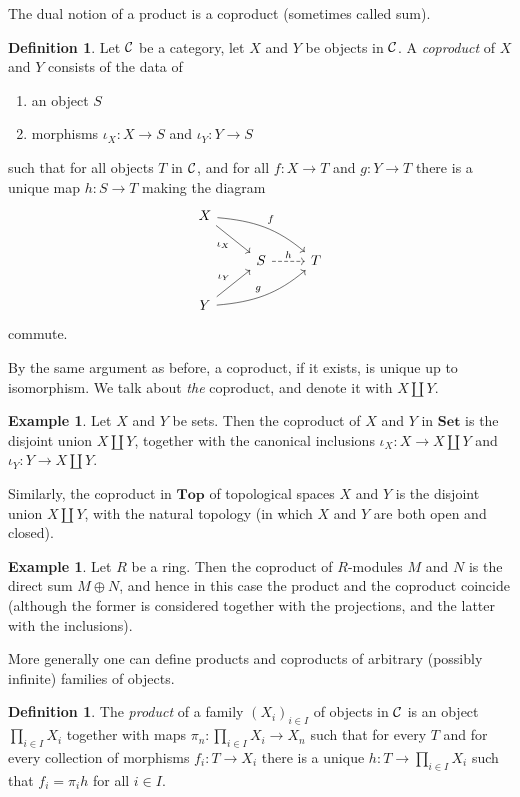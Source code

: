 \documentclass[11pt]{amsbook}
\def\Set{\mathbf{Set}}
\def\Top{\mathbf{Top}}
\theoremstyle{plain}
\theoremstyle{definition}
\newtheorem{definition}[theorem]{Definition}
\newtheorem{example}[theorem]{Example}
\begin{document}
The dual notion of a product is a coproduct  (sometimes called sum).

\begin{definition}
Let ${\mathcal{C}}$ be a category, let $X$ and $Y$ be objects in ${\mathcal{C}}$.  A \emph{coproduct} of $X$ and $Y$
consists of the data of
\begin{enumerate}
\item an object $S$
\item  morphisms $\iota_X\colon X \to S$ and $\iota_Y\colon Y \to S$
\end{enumerate}
such that for all objects $T$ in ${\mathcal{C}}$, and for all $f\colon X\to T$ and $g\colon Y\to T$ there is a unique map $h\colon S \to T$ making the diagram 
\[
\begin{tikzcd}
X \arrow[swap]{rd}{\iota_X} \arrow[out=-5,in=140]{rrd}{f} & & \\
& S \arrow[dashed]{r}{h} & T \\
Y \arrow{ru}{\iota_Y} \arrow[out=5,in=-140]{rru}{g} & & 
\end{tikzcd}
\]
commute.
\end{definition}

By the same argument as before, a coproduct, if it exists, is unique up to isomorphism. We talk about \emph{the} coproduct, and denote it with $X\amalg Y$.

\begin{example}Let $X$ and $Y$ be sets. Then the coproduct of $X$ and $Y$ in $\Set$ is the disjoint union $X\amalg Y$, together with the canonical inclusions $\iota_X \colon X\to X \amalg Y$ and $\iota_Y\colon Y \to X \amalg Y$. 

Similarly, the coproduct in $\Top$ of topological spaces $X$ and $Y$ is the disjoint union $X \amalg Y$, with the natural topology (in which $X$ and $Y$ are both open and closed).
\end{example}

\begin{example}
Let $R$ be a ring. Then the coproduct of $R$-modules $M$ and $N$ is the direct sum $M\oplus N$, and hence in this case the  product and the coproduct coincide (although the former is considered together with the projections, and the latter with the inclusions). 
\end{example}

More generally one can define products and coproducts of arbitrary (possibly infinite) families of objects.

\begin{definition}
The \emph{product} of a family $(X_i)_{i\in I}$  of objects in ${\mathcal{C}}$ is an object $\prod_{i\in I} X_i$ together with maps $\pi_n \colon \prod_{i\in I} X_i \to X_n$ such that for every $T$ and for every collection of morphisms $f_i \colon T\to X_i$ there is a unique $h\colon T\to \prod_{i\in I} X_i$ such that $f_i = \pi_ih$ for all $i\in I$.
\end{definition}
\end{document}
